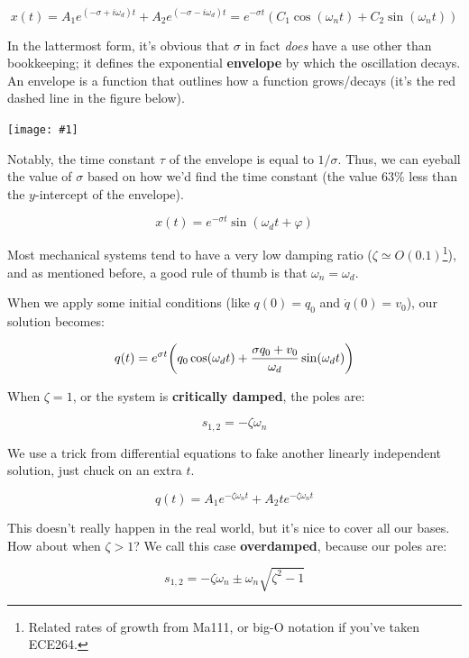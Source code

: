 \documentclass{report}
\newcommand{\bicture}[1]{
\begin{center}
    {\texttt{[image: \#1]}}
\end{center}}
\begin{document}
\begin{onehalfspacing}
\begin{flushleft}
\vspace{-0.1in}
\[x(t) = A_1 e^{(-\sigma + i\omega_d) t} + A_2 e^{(-\sigma - i\omega_d) t} = e^{-\sigma t} (C_1 \cos(\omega_n t) + C_2 \sin(\omega_n t))\]

In the lattermost form, it's obvious that \(\sigma\) in fact \textit{does} have a use other than bookkeeping; it defines the exponential \textbf{envelope} by which the oscillation decays. An envelope is a function that outlines how a function grows/decays (it's the red dashed line in the figure below).

\bicture{5_env}

Notably, the time constant \(\tau\) of the envelope is equal to \(1/\sigma\). Thus, we can eyeball the value of \(\sigma\) based on how we'd find the time constant (the value \(63\%\) less than the \(y\)-intercept of the envelope).

\vspace{-0.1in}
\[x(t) = e^{-\sigma t} \sin(\omega_d t + \varphi)\]

Most mechanical systems tend to have a very low damping ratio (\(\zeta \simeq O(0.1)\)\footnote{Related rates of growth from Ma111, or big-O notation if you've taken ECE264.}), and as mentioned before, a good rule of thumb is that \(\omega_n = \omega_d\).

\medskip

When we apply some initial conditions (like \(q(0) = q_0\) and \(\dot{q}(0) = v_0\)), our solution becomes:

\vspace{-0.1in}
\[q(t) = e^{\sigma t} \qty(q_0 \cos(\omega_d t) + \frac{\sigma q_0 + v_0}{\omega_d} \sin(\omega_d t))\]

When \(\zeta = 1\), or the system is \textbf{critically damped}, the poles are:

\vspace{-0.1in}
\[s_{1, 2} = -\zeta \omega_n\]

We use a trick from differential equations to fake another linearly independent solution, just chuck on an extra \(t\).

\vspace{-0.1in}
\[q(t) = A_1 e^{-\zeta \omega_n t} + A_2 t e^{-\zeta \omega_n t}\]

This doesn't really happen in the real world, but it's nice to cover all our bases. How about when \(\zeta > 1\)? We call this case \textbf{overdamped}, because our poles are:

\vspace{-0.1in}
\[s_{1, 2} = -\zeta \omega_n \pm \omega_n \sqrt{\zeta^2 - 1}\]


\end{flushleft}
\end{onehalfspacing}
\end{document}
